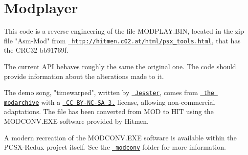 \chapter{Modplayer}
\hypertarget{md_modplayer_2README}{}\label{md_modplayer_2README}
\label{md_modplayer_2README_autotoc_md9}%
%
 This code is a reverse engineering of the file MODPLAY.\+BIN, located in the zip file "{}\+Asm-\/\+Mod"{} from \href{http://hitmen.c02.at/html/psx_tools.html}{\texttt{ http\+://hitmen.\+c02.\+at/html/psx\+\_\+tools.\+html}}, that has the CRC32 bb91769f.

The current API behaves roughly the same the original one. The code should provide information about the alterations made to it.

The demo song, "{}timewarped"{}, written by \href{https://modarchive.org/index.php?request=view_profile&query=69138}{\texttt{ Jesster}}, comes from \href{https://modarchive.org/index.php?request=view_by_moduleid&query=106481}{\texttt{ the modarchive}} with a \href{https://creativecommons.org/licenses/by-nc-sa/3.0/}{\texttt{ CC BY-\/\+NC-\/\+SA 3.}} license, allowing non-\/commercial adaptations. The file has been converted from MOD to HIT using the MODCONV.\+EXE software provided by Hitmen.

A modern recreation of the MODCONV.\+EXE software is available within the PCSX-\/\+Redux project itself. See the \href{https://github.com/grumpycoders/pcsx-redux/tree/main/tools/modconv}{\texttt{ modconv}} folder for more information. 